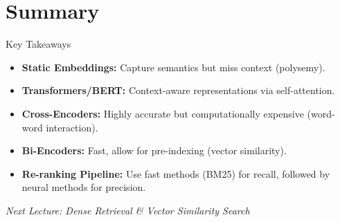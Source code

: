 \documentclass[aspectratio=169]{beamer}
\begin{document}
\section{Summary}

\begin{frame}{Key Takeaways}
\begin{itemize}
    \item[\checkmark] \textbf{Static Embeddings:} Capture semantics but miss context (polysemy).
    \item[\checkmark] \textbf{Transformers/BERT:} Context-aware representations via self-attention.
    \item[\checkmark] \textbf{Cross-Encoders:} Highly accurate but computationally expensive (word-word interaction).
    \item[\checkmark] \textbf{Bi-Encoders:} Fast, allow for pre-indexing (vector similarity).
    \item[\checkmark] \textbf{Re-ranking Pipeline:} Use fast methods (BM25) for recall, followed by neural methods for precision.
\end{itemize}

\vspace{1em}
\begin{center}
\textit{Next Lecture: Dense Retrieval \& Vector Similarity Search}
\end{center}
\end{frame}
\end{document}
